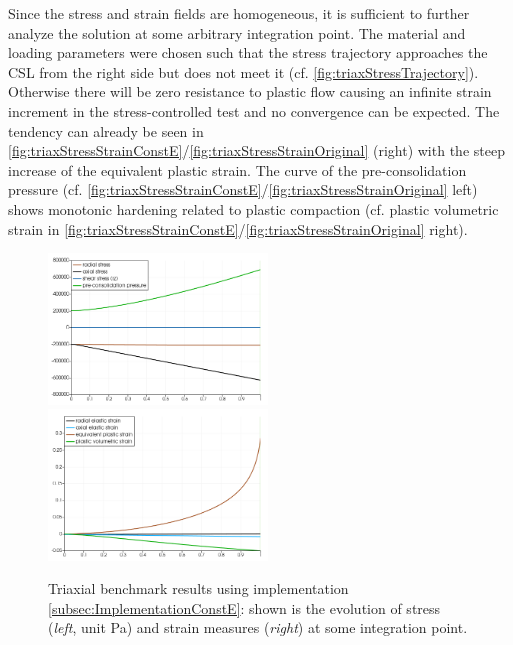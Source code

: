 \documentclass[paper=a4, twoside, pagesize]{scrartcl}
\begin{document}
\par
\noindent
Since the stress and strain fields are homogeneous, it is sufficient to further analyze the solution at some arbitrary integration point.
The material and loading parameters were chosen such that the stress trajectory approaches the CSL from the right side but does not meet it (cf. \autoref{fig:triaxStressTrajectory}). Otherwise there will be zero resistance to plastic flow causing an infinite strain increment in the stress-controlled test and no convergence can be expected. The tendency can already be seen in \autoref{fig:triaxStressStrainConstE}/\ref{fig:triaxStressStrainOriginal} (right) with the steep increase of the equivalent plastic strain. The curve of the pre-consolidation pressure (cf. \autoref{fig:triaxStressStrainConstE}/\ref{fig:triaxStressStrainOriginal} left) shows monotonic hardening related to plastic compaction (cf. plastic volumetric strain in  \autoref{fig:triaxStressStrainConstE}/\ref{fig:triaxStressStrainOriginal} right).
\begin{figure}[h!]
  \includegraphics[width=0.52\textwidth]{img/SemiExplicitModifiedCamClay_OpenGeoSys2023/TriaxCamClay_StressControl_StressCurves.png}
  \includegraphics[width=0.52\textwidth]{img/SemiExplicitModifiedCamClay_OpenGeoSys2023/TriaxCamClay_StressControl_StrainCurves.png}
  \caption{Triaxial benchmark results using implementation \ref{subsec:ImplementationConstE}: shown is the evolution of stress (\textsl{left}, unit Pa) and strain measures (\textsl{right}) at some integration point.}\label{fig:triaxStressStrainConstE}
\end{figure}
\end{document}
